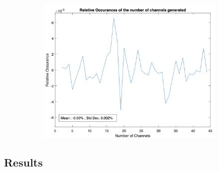 \begin{figure}
\begin{subfigure}{0.5\textwidth}
        \includegraphics[width=\textwidth]{images/technical_work/section_2_data generation/rel_occur_num_ch.png}
        \label{fig:tw:data_gen:rel_num_ch}
    \end{subfigure}
\end{figure}


\FloatBarrier
\subsection{Results}



